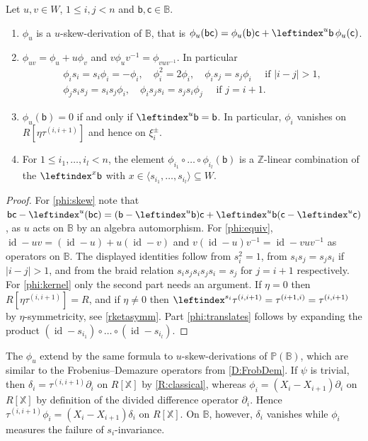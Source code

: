 \documentclass[a4paper,11pt]{amsart}
\numberwithin{equation}{subsection}
\theoremstyle{definition}
\theoremstyle{theorem}
\theoremstyle{remark}
\newcommand\Sym{W}
\newcommand\xipm{\xi^\pm}
\newcommand\bb{\mathsf{b}}
\newcommand\bc{\mathsf{c}}
\newcommand\op{\operatorname}
\newcommand\taui[1][i]{\tau^{(#1)}}
\newcommand\Po{\mathbb{P}(\mathbb{B})}
\newcommand\X{\mathbb{X}}
\newcommand\Z{\mathbb{Z}}
\newcommand{\Bo}{\mathbb{B}}
\begin{document}
\begin{Lemma}\label{L:phi}
  Let $u,v\in\Sym$, $1\le i,j<n$ and $\bb,\bc\in\Bo$.
  \begin{enumerate}
  \item\label{phi:skew} $\phi_u$ is a $u$-skew-derivation of $\Bo$, that is
    $\phi_u(\bb\bc)=\phi_u(\bb)\bc+\leftindex^u\bb\,\phi_u(\bc)$.
  \item\label{phi:equiv} $\phi_{uv}=\phi_u+u\phi_v$ and $v\phi_uv^{-1}=\phi_{vuv^{-1}}$.
    In particular
    \begin{gather*}
      \phi_is_i=s_i\phi_i=-\phi_i,\quad\phi_i^2=2\phi_i,\quad
      \phi_is_j=s_j\phi_i\quad \text{ if } |i-j|>1,\\
      \phi_js_is_j=s_is_j\phi_i,\quad \phi_is_js_i=s_js_i\phi_j\quad \text{ if } j=i+1 .
    \end{gather*}
  \item\label{phi:kernel} $\phi_u(\bb)=0$ if and only if $\leftindex^u\bb=\bb$.
    In particular, $\phi_i$ vanishes on $R[\eta\taui[i,i+1]]$ and hence on $\xipm_i$.
  \item\label{phi:translates} For $1\le i_1,\dots,i_l<n$,
    the element $\phi_{i_1}\circ\dots\circ\phi_{i_l}(\bb)$ is a $\Z$-linear combination of
    the $\leftindex^x\bb$ with $x\in \langle s_{i_1},\dots,s_{i_l}\rangle\subseteq\Sym$.
  \end{enumerate}
\end{Lemma}

\begin{proof}
  For \ref{phi:skew} note that
  $\bb\bc-\leftindex^u(\bb\bc)
   =(\bb-\leftindex^u\bb)\bc+\leftindex^u\bb(\bc-\leftindex^u\bc)$,
  as  $u$ acts on $\Bo$ by an algebra automorphism.  For \ref{phi:equiv},
  $\op{id}-uv=(\op{id}-u)+u(\op{id}-v)$ and $v(\op{id}-u)v^{-1}=\op{id}-vuv^{-1}$ as
  operators on $\Bo$. The displayed identities follow from $s_i^2=1$, from
  $s_is_j=s_js_i$ if $|i-j|>1$, and from the braid relation
  $s_is_js_is_js_i=s_j$ for $j=i+1$ respectively.  For \ref{phi:kernel}  only the second part needs an argument.  If $\eta=0$ then $R[\eta\taui[i,i+1]]=R$, and if
  $\eta\not=0$ then $\leftindex^{s_i}{{\taui[i,i+1]}}=\taui[i+1,i]=\taui[i,i+1]$ by
  $\eta$-symmetricity, see \autoref{rketasymm}. Part \ref{phi:translates} follows by
  expanding the product $(\op{id}-s_{i_1})\circ\dots\circ(\op{id}-s_{i_l})$.
\end{proof}

\begin{Remark}\label{R:phivsdelta}
The $\phi_u$ extend by the same formula to $u$-skew-derivations of $\Po$, which are similar to the Frobenius--Demazure operators from \autoref{D:FrobDem}. If $\psi$ is trivial, then
  $\delta_i=\taui[i,i+1]\partial_i$ on $R[\X]$ by \autoref{R:classical}, whereas
  $\phi_i=(X_i-X_{i+1})\partial_i$ on $R[\X]$ by definition of the divided
  difference operator $\partial_i$. Hence $\taui[i,i+1]\phi_i=(X_i-X_{i+1})\delta_i$
  on $R[\X]$. On $\Bo$, however, $\delta_i$ vanishes while $\phi_i$
  measures the failure of $s_i$-invariance.
\end{Remark}
\end{document}
